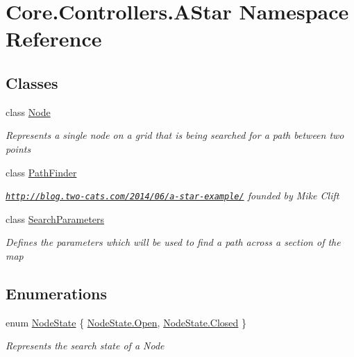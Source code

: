 \hypertarget{namespaceCore_1_1Controllers_1_1AStar}{}\section{Core.\+Controllers.\+A\+Star Namespace Reference}
\label{namespaceCore_1_1Controllers_1_1AStar}
\subsection*{Classes}
\begin{DoxyCompactItemize}
\item 
class \hyperlink{classCore_1_1Controllers_1_1AStar_1_1Node}{Node}
\begin{DoxyCompactList}\small\item\em Represents a single node on a grid that is being searched for a path between two points \end{DoxyCompactList}\item 
class \hyperlink{classCore_1_1Controllers_1_1AStar_1_1PathFinder}{Path\+Finder}
\begin{DoxyCompactList}\small\item\em \href{http://blog.two-cats.com/2014/06/a-star-example/}{\tt http\+://blog.\+two-\/cats.\+com/2014/06/a-\/star-\/example/} founded by Mike Clift \end{DoxyCompactList}\item 
class \hyperlink{classCore_1_1Controllers_1_1AStar_1_1SearchParameters}{Search\+Parameters}
\begin{DoxyCompactList}\small\item\em Defines the parameters which will be used to find a path across a section of the map \end{DoxyCompactList}\end{DoxyCompactItemize}
\subsection*{Enumerations}
\begin{DoxyCompactItemize}
\item 
enum \hyperlink{namespaceCore_1_1Controllers_1_1AStar_a35790b9ccd2b721f3e90cb49769caab9}{Node\+State} \{ \hyperlink{namespaceCore_1_1Controllers_1_1AStar_a35790b9ccd2b721f3e90cb49769caab9ac3bf447eabe632720a3aa1a7ce401274}{Node\+State.\+Open}, 
\hyperlink{namespaceCore_1_1Controllers_1_1AStar_a35790b9ccd2b721f3e90cb49769caab9a03f4a47830f97377a35321051685071e}{Node\+State.\+Closed}
 \}\begin{DoxyCompactList}\small\item\em Represents the search state of a Node \end{DoxyCompactList}
\end{DoxyCompactItemize}


